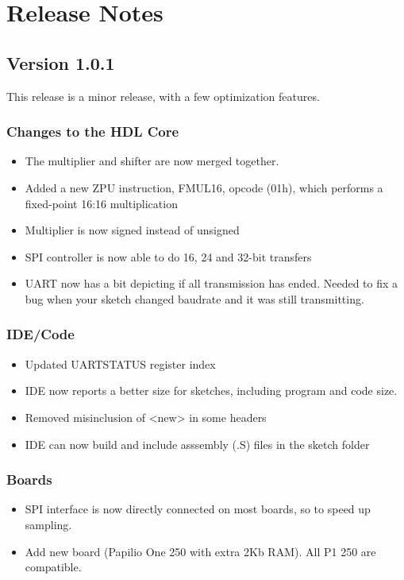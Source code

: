 \chapter{Release Notes}

\section{Version 1.0.1}

This release is a minor release, with a few optimization features.

\subsection*{Changes to the HDL Core}
\begin{itemize}
\item The multiplier and shifter are now merged together.
\item Added a new ZPU instruction, FMUL16, opcode (01h), which performs a fixed-point 16:16 multiplication
\item Multiplier is now signed instead of unsigned
\item SPI controller is now able to do 16, 24 and 32-bit transfers
\item UART now has a bit depicting if all transmission has ended. Needed to fix a bug when your sketch changed baudrate and it was still transmitting.
\end{itemize}

\subsection*{IDE/Code}
\begin{itemize}
\item Updated UARTSTATUS register index
\item IDE now reports a better size for sketches, including program and code size.
\item Removed misinclusion of <new> in some headers
\item IDE can now build and include asssembly (.S) files in the sketch folder
\end{itemize}

\subsection*{Boards}
\begin{itemize}
\item SPI interface is now directly connected on most boards, so to speed up sampling.
\item Add new board (Papilio One 250 with extra 2Kb RAM). All P1 250 are compatible.
\end{itemize}

